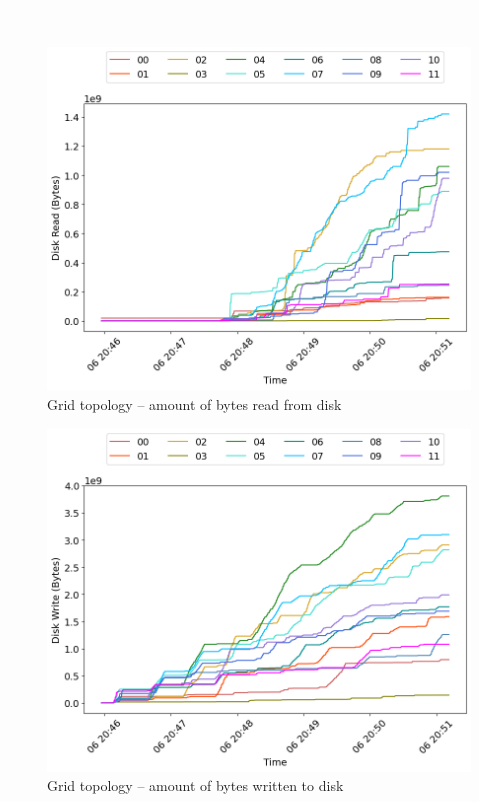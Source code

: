 \textcolor{white}{.}\\\\

\begin{minipage}{0.5\linewidth}
\begin{figure}[H]
\captionsetup{justification=centering,width=0.8\linewidth}
\includegraphics[width=\linewidth]{figures/grid/blk_read.png}
\caption{Grid topology -- amount of bytes read from disk}
\label{fig:grid-net_read}
\end{figure}
\end{minipage}
\begin{minipage}{0.5\linewidth}
\begin{figure}[H]
\captionsetup{justification=centering,width=0.8\linewidth}
\includegraphics[width=\linewidth]{figures/grid/blk_write.png}
\caption{Grid topology -- amount of bytes written to disk}
\label{fig:grid-net_write}
\end{figure}
\end{minipage}


